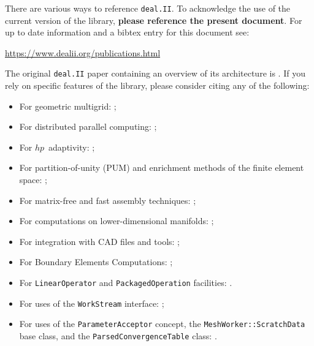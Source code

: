 \documentclass{ansarticle-preprint}
\newcommand{\specialword}[1]{\texttt{#1}}
\newcommand{\dealii}{{\specialword{deal.II}}\xspace}
\begin{document}
There are various ways to reference \dealii. To acknowledge the use of
the current version of the library, \textbf{please reference the present
document}. For up to date information and a bibtex entry for this document
see:
\begin{center}
 \url{https://www.dealii.org/publications.html}
\end{center}

The original \texttt{\dealii} paper containing an overview of its
architecture is \cite{BangerthHartmannKanschat2007}. If you rely on
specific features of the library, please consider citing any of the
following:
\begin{itemize}
 \item For geometric multigrid: \cite{Kanschat2004,JanssenKanschat2011,ClevengerHeisterKanschatKronbichler2019};
 \item For distributed parallel computing: \cite{BangerthBursteddeHeisterKronbichler11};
 \item For $hp$~adaptivity: \cite{BangerthKayserHerold2007};
  \item For partition-of-unity (PUM) and enrichment methods of the
    finite element space: \cite{Davydov2016};
 \item For matrix-free and fast assembly techniques:
   \cite{KronbichlerKormann2012,KronbichlerKormann2019};
 \item For computations on lower-dimensional manifolds:
   \cite{DeSimoneHeltaiManigrasso2009};
 \item For integration with CAD files and tools:
   \cite{HeltaiMola2015};
 \item For Boundary Elements Computations:
   \cite{GiulianiMolaHeltai-2018-a};
 \item For \texttt{LinearOperator} and \texttt{PackagedOperation} facilities:
   \cite{MaierBardelloniHeltai-2016-a,MaierBardelloniHeltai-2016-b}.
 \item For uses of the \texttt{WorkStream} interface:
   \cite{TKB16};
   \item For uses of the \texttt{ParameterAcceptor} concept, the
     \texttt{MeshWorker::ScratchData} base class, and the
     \texttt{ParsedConvergenceTable} class: \cite{SartoriGiulianiBardelloni-2018-a}.
\end{itemize}
\end{document}
